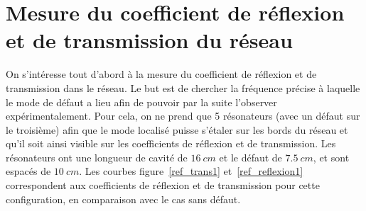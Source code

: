 \section{Mesure du coefficient de réflexion et de transmission du réseau}
On s'intéresse tout d'abord à la mesure du coefficient de réflexion et de transmission dans le réseau. Le but est de chercher la fréquence précise à laquelle le mode de défaut a lieu afin de pouvoir par la suite l'observer expérimentalement. Pour cela, on ne prend que 5 résonateurs (avec un défaut sur le troisième) afin que le mode localisé puisse s'étaler sur les bords du réseau et qu'il soit ainsi visible sur les coefficients de réflexion et de transmission. Les résonateurs ont une longueur de cavité de $16~cm$ et le défaut de $7.5~cm$, et sont espacés de $10~cm$. Les courbes figure~\ref{ref_trans1} et~\ref{ref_reflexion1} correspondent aux coefficients de réflexion et de transmission pour cette configuration, en comparaison avec le cas sans défaut.

